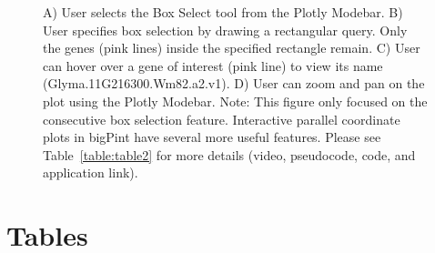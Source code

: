 \documentclass[parskip=full]{bmcart} %
\begin{document}
\begin{backmatter}
\begin{figure}[h!]
\caption{
A) User selects the Box Select tool from the Plotly Modebar. B) User specifies box selection by drawing a rectangular query. Only the genes (pink lines) inside the specified rectangle remain. C) User can hover over a gene of interest (pink line) to view its name (Glyma.11G216300.Wm82.a2.v1). D) User can zoom and pan on the plot using the Plotly Modebar. Note: This figure only focused on the consecutive box selection feature. Interactive parallel coordinate plots in bigPint have several more useful features. Please see Table~\ref{table:table2} for more details (video, pseudocode, code, and application link).}
\label{figurePCP}
\end{figure}


\section*{Tables}


\end{backmatter}
\end{document}
